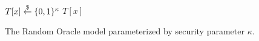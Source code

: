\begin{figure}[ht]
\begin{algorithm}[H]
    \caption{\label{alg.ro} The Random Oracle model parameterized by security
             parameter $\kappa$.}
    \begin{algorithmic}[1]
                \State$T[x] \overset{\$}{\gets} \{0, 1\}^\kappa$
            \EndIf
            \State\Return$T[x]$
        \EndFunction
        \vskip8pt
    \end{algorithmic}
\end{algorithm}
\end{figure}
